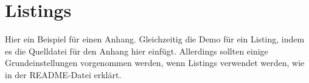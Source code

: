 \section{Listings}
\label{appendix_dummy}
  Hier ein Beispiel für einen Anhang.
  Gleichzeitig die Demo für ein Listing, indem es die Quelldatei für den Anhang hier einfügt.
  Allerdings sollten einige Grundeinstellungen vorgenommen werden, wenn Listings verwendet werden, wie in der README-Datei erklärt.